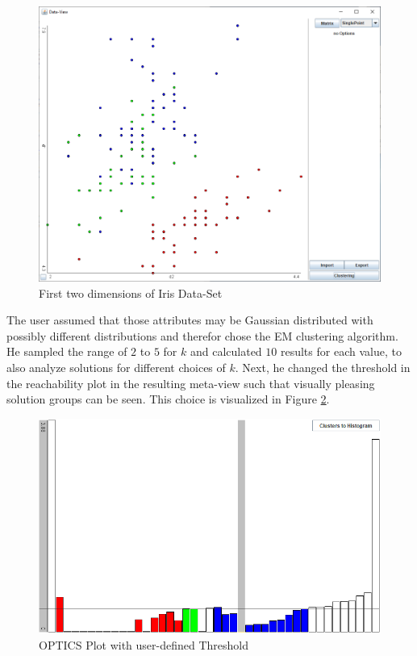 \documentclass[
	a4paper,
	english,
	twoside,
	openright,               
	11pt                            
	]{report}
\begin{document}
\begin{figure}[h]
	\centering
	\includegraphics[scale=.4]{iris2}
	\caption{First two dimensions of Iris Data-Set}
	\label{fig:iris}
\end{figure}

The user assumed that those attributes may be Gaussian distributed with possibly different distributions and therefor chose the EM clustering algorithm. He sampled the range of $2$ to $5$ for $k$ and calculated $10$ results for each value, to also analyze solutions for different choices of $k$. Next, he changed the threshold in the reachability plot in the resulting meta-view such that visually pleasing solution groups can be seen. This choice is visualized in Figure \ref{fig:user_iris_optics}.

\begin{figure}[h]
	\centering
	\includegraphics[scale=.4]{user_iris_optics}
	\caption{OPTICS Plot with user-defined Threshold}
	\label{fig:user_iris_optics}
\end{figure}
\end{document}
